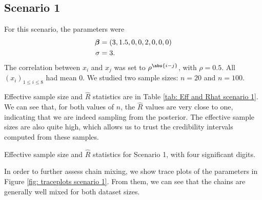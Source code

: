 \documentclass[a4paper, 10pt]{article}
\begin{document}
\subsection*{Scenario 1}

For this scenario, the parameters were
\begin{align*}
    \boldsymbol{\beta} &= (3, 1.5, 0, 0, 2, 0, 0, 0) \\
    \sigma &= 3
.\end{align*}
The correlation between $ x_{ i } $ and $ x_{ j } $ was set to $ \rho^{ \abs{ i - j } } $, with $ \rho = 0.5 $.
All $ (x_{ i })_{ 1 \leq i \leq 8 } $ had mean $ 0 $.
We studied two sample sizes: $ n = 20 $ and $ n = 100 $.

Effective sample size and $ \hat{ R } $ statistics are in Table \ref{tab: Eff and Rhat scenario 1}.
We can see that, for both values of $ n $, the $ \hat{ R } $ values are very close to one, indicating that we are indeed sampling from the posterior.
The effective sample sizes are also quite high, which allows us to trust the credibility intervals computed from these samples.
\begin{table}[htb]
    \centering
    
    \quad
    
    \caption{Effective sample size and $ \hat{ R } $ statistics for Scenario 1, with four significant digits.}
    \label{tab: Eff and Rhat scenario 1}
\end{table}
In order to further assess chain mixing, we show trace plots of the parameters in Figure \ref{fig: traceplots scenario 1}.
From them, we can see that the chains are generally well mixed for both dataset sizes.
\end{document}
